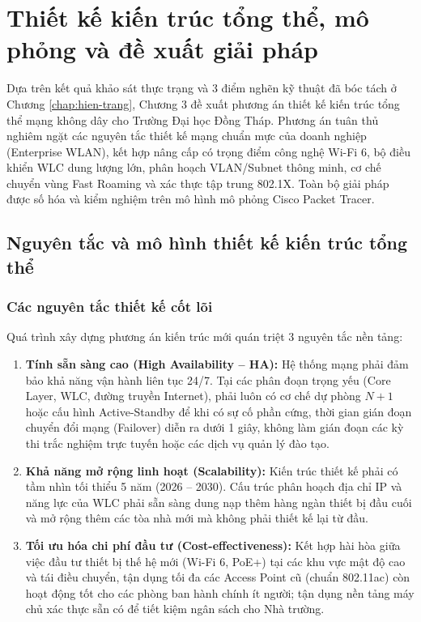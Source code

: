 \chapter{Thiết kế kiến trúc tổng thể, mô phỏng và đề xuất giải pháp}
\label{chap:giai-phap}

Dựa trên kết quả khảo sát thực trạng và 3 điểm nghẽn kỹ thuật đã bóc tách ở Chương \ref{chap:hien-trang}, Chương 3 đề xuất phương án thiết kế kiến trúc tổng thể mạng không dây cho Trường Đại học Đồng Tháp. Phương án tuân thủ nghiêm ngặt các nguyên tắc thiết kế mạng chuẩn mực của doanh nghiệp (Enterprise WLAN), kết hợp nâng cấp có trọng điểm công nghệ Wi-Fi 6, bộ điều khiển WLC dung lượng lớn, phân hoạch VLAN/Subnet thông minh, cơ chế chuyển vùng Fast Roaming và xác thực tập trung 802.1X. Toàn bộ giải pháp được số hóa và kiểm nghiệm trên mô hình mô phỏng Cisco Packet Tracer.

\section{Nguyên tắc và mô hình thiết kế kiến trúc tổng thể}

\subsection{Các nguyên tắc thiết kế cốt lõi}

Quá trình xây dựng phương án kiến trúc mới quán triệt 3 nguyên tắc nền tảng:
\begin{enumerate}
    \item \textbf{Tính sẵn sàng cao (High Availability -- HA):} Hệ thống mạng phải đảm bảo khả năng vận hành liên tục 24/7. Tại các phân đoạn trọng yếu (Core Layer, WLC, đường truyền Internet), phải luôn có cơ chế dự phòng $N+1$ hoặc cấu hình Active-Standby để khi có sự cố phần cứng, thời gian gián đoạn chuyển đổi mạng (Failover) diễn ra dưới 1 giây, không làm gián đoạn các kỳ thi trắc nghiệm trực tuyến hoặc các dịch vụ quản lý đào tạo.
    \item \textbf{Khả năng mở rộng linh hoạt (Scalability):} Kiến trúc thiết kế phải có tầm nhìn tối thiểu 5 năm (2026 -- 2030). Cấu trúc phân hoạch địa chỉ IP và năng lực của WLC phải sẵn sàng dung nạp thêm hàng ngàn thiết bị đầu cuối và mở rộng thêm các tòa nhà mới mà không phải thiết kế lại từ đầu.
    \item \textbf{Tối ưu hóa chi phí đầu tư (Cost-effectiveness):} Kết hợp hài hòa giữa việc đầu tư thiết bị thế hệ mới (Wi-Fi 6, PoE+) tại các khu vực mật độ cao và tái điều chuyển, tận dụng tối đa các Access Point cũ (chuẩn 802.11ac) còn hoạt động tốt cho các phòng ban hành chính ít người; tận dụng nền tảng máy chủ xác thực sẵn có để tiết kiệm ngân sách cho Nhà trường.
\end{enumerate}

